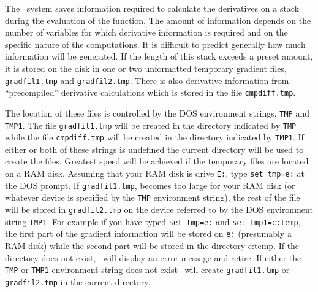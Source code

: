 \documentclass[12pt]{book}
\begin{document}
\endchapter

\htmlnewfile 
The \AD\ system saves information required to calculate the
derivatives on a stack during the evaluation of the function. 
The amount of information depends on the number of variables for which
derivative information is required and on the specific nature of the
computations. It is difficult to predict generally how much information
will be generated. If the
length of this stack exceeds a preset amount, it is stored on the disk 
in one or two unformatted temporary gradient files, 
{\tt gradfil1.tmp} and {\tt gradfil2.tmp}. There is also
derivative information from ``precompiled'' derivative calculations
which is stored in the file {\tt cmpdiff.tmp}. 

The location of these files
is controlled by the DOS environment strings, {\tt TMP} and {\tt TMP1}.
The file {\tt gradfil1.tmp} will be created in the directory
indicated by {\tt TMP} while the file
{\tt cmpdiff.tmp} will be created in the directory indicated by 
 {\tt TMP1}. If either or both of these strings is undefined the 
current directory will be used to create the files.
Greatest speed will be achieved if the temporary files are located on a
RAM disk. Assuming that your RAM disk is drive {\tt E:}, type 
{\tt set tmp=e:} at the DOS prompt. If {\tt gradfil1.tmp}, becomes
too large for your RAM disk (or whatever device is specified by the
{\tt TMP} environment string), the rest of the file will be stored in
{\tt gradfil2.tmp} on 
the device referred to by the DOS environment string {\tt TMP1}. 
For example if you have typed {\tt set tmp=e:} and
{\tt set tmp1=c:\bs temp}, 
the first part of the gradient information will be stored on {\tt e:} 
(presumably a RAM disk) while the second part will
be stored in the directory {\ttt c:\bs temp}. 
If the directory does not exist, \AD\ will display
an error message and retire. If either the {\tt TMP} or {\tt TMP1} 
environment string does not
exist \AD\ will create {\tt gradfil1.tmp} or {\tt gradfil2.tmp} 
in the current directory.
\end{document}
